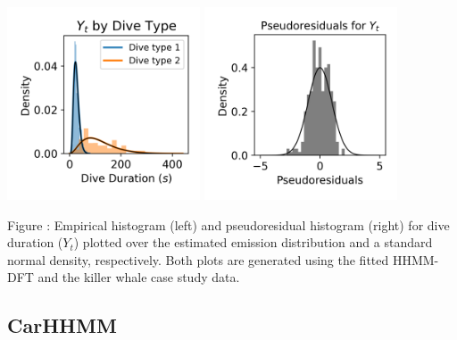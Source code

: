 \documentclass{article}
\begin{document}
        \begin{center}
        \includegraphics[width=2.25in]{../Plots/2019/20190902-182840-CATs_OB_1_0_267_HHMM_empirical_hist_dive_duration.png}
        \includegraphics[width=2.25in]{../Plots/2019/20190902-182840-CATs_OB_1_0_267_HHMM_pseudresids_Dive_Duration.png}
        \end{center}
        
        \noindent Figure : Empirical histogram (left) and pseudoresidual histogram (right) for dive duration ($Y_{t}$) plotted over the estimated emission distribution and a standard normal density, respectively. Both plots are generated using the fitted HHMM-DFT and the killer whale case study data.
        \addtocounter{fignum}{1}
        
        \subsection{CarHHMM}
        
\end{document}
